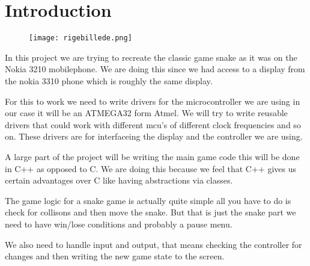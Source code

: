 \chapter*{Introduction}


\begin{figure}
\centering
\texttt{[image: rigebillede.png]}
\end{figure}

In this project we are trying to recreate the classic game snake as it was on the Nokia 3210 mobilephone.
We are doing this since we had access to a display from the nokia 3310 phone which is roughly the same display.

For this to work we need to write drivers for the microcontroller we are using in our case it will be an ATMEGA32 form Atmel.
We will try to write reusable drivers that could work with different mcu's of different clock frequencies and so on. 
These drivers are for interfaceing the display and the controller we are using. 

A large part of the project will be writing the main game code this will be done in C++ as opposed to C. 
We are doing this because we feel that C++ gives us certain advantages over C like having abstractions via classes.

The game logic for a snake game is actually quite simple all you have to do is check for collisons and then move the snake.
But that is just the snake part we need to have win/lose conditions and probably a pause menu. 

We also need to handle input and output, that means checking the controller for changes and then writing the new game state to the screen.
